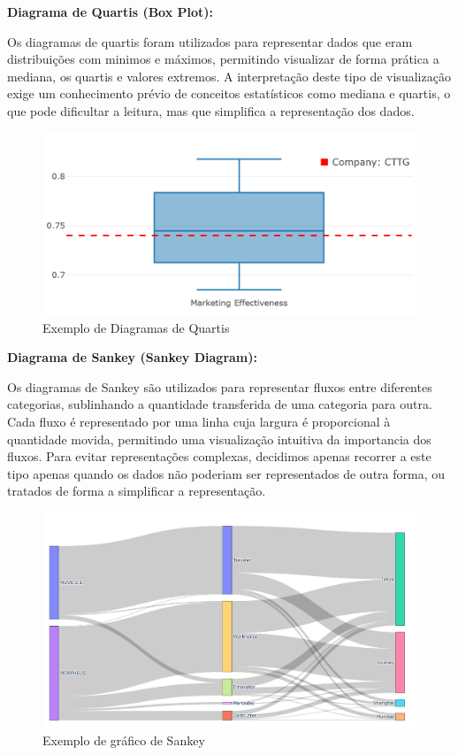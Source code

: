 \textbf{Diagrama de Quartis (Box Plot):}

Os diagramas de quartis foram utilizados para representar dados que eram distribuições com minimos e máximos, permitindo visualizar de forma prática a mediana, os quartis e valores extremos.  A interpretação deste tipo de visualização exige um conhecimento prévio de conceitos estatísticos como mediana e quartis, o que pode dificultar a leitura, mas que simplifica a representação dos dados.

\begin{figure}[H]
    \centering
    \includegraphics[max width=12cm, keepaspectratio]{./img/box}
    \caption{Exemplo de Diagramas de Quartis}
\end{figure}
\noindent

\textbf{Diagrama de Sankey (Sankey Diagram):}

Os diagramas de Sankey são utilizados para representar fluxos entre diferentes categorias, sublinhando a quantidade transferida de uma categoria para outra. Cada fluxo é representado por uma linha cuja largura é proporcional à quantidade movida, permitindo uma visualização intuitiva da importancia dos fluxos. Para evitar representações complexas, decidimos apenas recorrer a este tipo apenas quando os dados não poderiam ser representados de outra forma, ou tratados de forma a simplificar a representação.

\begin{figure}[H]
    \centering
    \includegraphics[max width=12cm, keepaspectratio]{./img/skankey}
    \caption{Exemplo de gráfico de Sankey}
\end{figure}
\noindent

